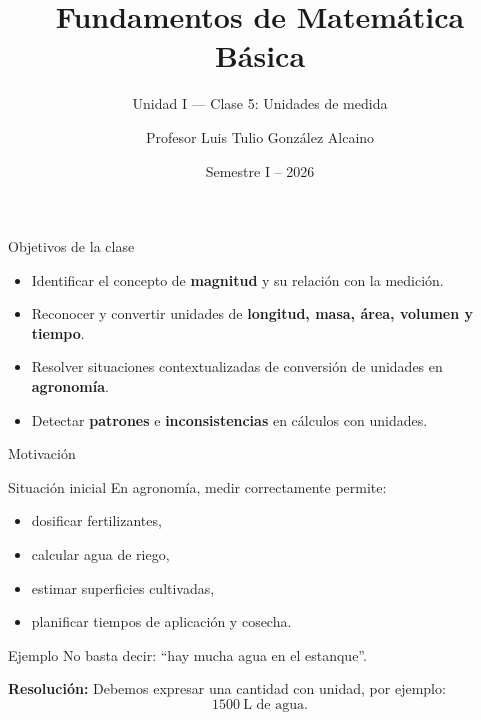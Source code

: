 \documentclass[aspectratio=169,10pt]{beamer}
\title[MAT Básica]{Fundamentos de Matemática Básica}
\subtitle{Unidad I --- Clase 5: Unidades de medida}
\author{Profesor Luis Tulio González Alcaino}
\institute{Universidad Santo Tomás \\ Departamento Ciencias Básicas --- Talca}
\date{Semestre I -- 2026}
\newcommand{\ejemplo}[2]{
	\begin{exampleblock}{Ejemplo}
		#1
		
		\vspace{0.5em}
		\textbf{Resolución:} #2
	\end{exampleblock}
}
\begin{document}
	
	\begin{frame}
		\titlepage
	\end{frame}
	
	\begin{frame}{Objetivos de la clase}
		\begin{itemize}[<+->]
			\item Identificar el concepto de \textbf{magnitud} y su relación con la medición.
			\item Reconocer y convertir unidades de \textbf{longitud, masa, área, volumen y tiempo}.
			\item Resolver situaciones contextualizadas de conversión de unidades en \textbf{agronomía}.
			\item Detectar \textbf{patrones} e \textbf{inconsistencias} en cálculos con unidades.
		\end{itemize}
	\end{frame}
	
	\begin{frame}{Motivación}
		\begin{block}{Situación inicial}
			En agronomía, medir correctamente permite:
			\begin{itemize}[<+->]
				\item dosificar fertilizantes,
				\item calcular agua de riego,
				\item estimar superficies cultivadas,
				\item planificar tiempos de aplicación y cosecha.
			\end{itemize}
		\end{block}
		
		\pause
		\ejemplo
		{No basta decir: ``hay mucha agua en el estanque''.}
		{Debemos expresar una cantidad con unidad, por ejemplo:
			\[
			1500\ \text{L de agua}.
			\]
		}
	\end{frame}
	
\end{document}
